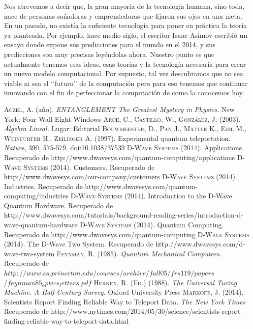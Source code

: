 \documentclass[11pt,a4paper]{article}
\begin{document}
Nos atrevemos a decir que, la gran mayoría de la tecnología humana, sino toda, nace de personas soñadoras y emprendedoras que fijaron sus ojos en una meta. En un pasado, no existía la suficiente tecnología para poner en práctica la teoría ya planteada. Por ejemplo, hace medio siglo, el escritor Isaac Asimov escribió un ensayo donde expone sus predicciones para el mundo en el 2014, y sus predicciones son muy precisas leyéndolas ahora. Nuestro punto es que actualmente tenemos esas ideas, esas teorías y la tecnología necesaria para crear un nuevo modelo computacional. Por supuesto, tal vez descubramos que no sea viable ni sea el ‘‘futuro’’ de la computación pero para eso tenemos que continuar innovando con el fin de perfeccionar la computación de como la conocemos hoy.

\clearpage
\begin{thebibliography}{X}
 \textsc{Aczel, A.} (año). \textit{ENTANGLEMENT The Greatest Mystery in Physics.} New York: Four Wall Eight Windows
 \textsc{Arce, C., Castillo, W., González, J.} (2003). \textit{Álgebra Lineal.} Lugar: Editorial
 \textsc{Bouwmeester, D., Pan J., Mattle K., Eibl M., Weinfurter H., Zeilinger A.} (1997). Experimental quantum teleportation. \textit{Nature}, 390, 575-579. doi:10.1038/37539
 \textsc{D-Wave Systems} (2014). Applications. Recuperado de http://www.dwavesys.com/quantum-computing/applications
 \textsc{D-Wave Systems} (2014). Customers. Recuperado de http://www.dwavesys.com/our-company/customers
 \textsc{D-Wave Systems} (2014). Industries. Recuperado de http://www.dwavesys.com/quantum-computing/industries
 \textsc{D-Wave Systems} (2014). Introduction to the D-Wave Quantum Hardware. Recuperado de http://www.dwavesys.com/tutorials/background-reading-series/introduction-d-wave-quantum-hardware
 \textsc{D-Wave Systems} (2014). Quantum Computing. Recuperado de http://www.dwavesys.com/quantum-computing
 \textsc{D-Wave Systems} (2014). The D-Wave Two System. Recuperado de http://www.dwavesys.com/d-wave-two-system
 \textsc{Feynman, R.} (1985). \textit{Quantum Mechanical Computers.} Recuperado de $http://www.cs.princeton.edu/courses/archive/fall05/frs119/papers$
$/feynman85_optics_letters.pdf$
 \textsc{Herken, R. (Ed.)} (1988). \textit{The Universal Turing Machine. A Half-Century Survey.} Oxford University Press
 \textsc{Markoff, J.} (2014). Scientists Report Finding Reliable Way to Teleport Data. \textit{The New York Times} Recuperado de http://www.nytimes.com/2014/05/30/science/scientists-report-finding-reliable-way-to-teleport-data.html

\end{thebibliography}
\end{document}
